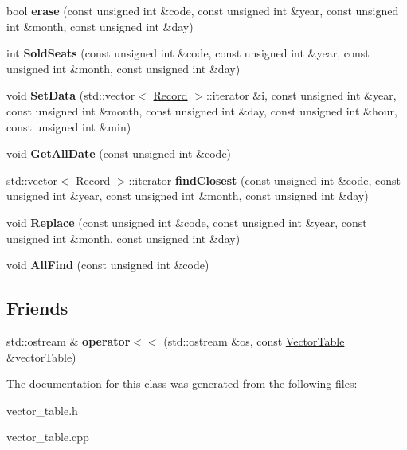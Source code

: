\begin{DoxyCompactItemize}
\item 
\hypertarget{class_vector_table_ac7d26230e13f94f50c6f064012e4fadc}{}bool {\bfseries erase} (const unsigned int \&code, const unsigned int \&year, const unsigned int \&month, const unsigned int \&day)\label{class_vector_table_ac7d26230e13f94f50c6f064012e4fadc}

\item 
\hypertarget{class_vector_table_a434d4a994da0298c0de17763b4ba31a4}{}int {\bfseries Sold\+Seats} (const unsigned int \&code, const unsigned int \&year, const unsigned int \&month, const unsigned int \&day)\label{class_vector_table_a434d4a994da0298c0de17763b4ba31a4}

\item 
\hypertarget{class_vector_table_a81b28afda7a5c323a1dbdffd17b4d866}{}void {\bfseries Set\+Data} (std\+::vector$<$ \hyperlink{struct_record}{Record} $>$\+::iterator \&i, const unsigned int \&year, const unsigned int \&month, const unsigned int \&day, const unsigned int \&hour, const unsigned int \&min)\label{class_vector_table_a81b28afda7a5c323a1dbdffd17b4d866}

\item 
\hypertarget{class_vector_table_a4c9eecaa002bc1ebe62fd61c1ef3567f}{}void {\bfseries Get\+All\+Date} (const unsigned int \&code)\label{class_vector_table_a4c9eecaa002bc1ebe62fd61c1ef3567f}

\item 
\hypertarget{class_vector_table_a12f53f971c363ddf5ca9c75c1c8ef0e1}{}std\+::vector$<$ \hyperlink{struct_record}{Record} $>$\+::iterator {\bfseries find\+Closest} (const unsigned int \&code, const unsigned int \&year, const unsigned int \&month, const unsigned int \&day)\label{class_vector_table_a12f53f971c363ddf5ca9c75c1c8ef0e1}

\item 
\hypertarget{class_vector_table_af0f4cf878c18e1d09d5154473f53b61c}{}void {\bfseries Replace} (const unsigned int \&code, const unsigned int \&year, const unsigned int \&month, const unsigned int \&day)\label{class_vector_table_af0f4cf878c18e1d09d5154473f53b61c}

\item 
\hypertarget{class_vector_table_a30c5fe29b1bd9b73d0dff4e41c54afa6}{}void {\bfseries All\+Find} (const unsigned int \&code)\label{class_vector_table_a30c5fe29b1bd9b73d0dff4e41c54afa6}

\end{DoxyCompactItemize}
\subsection*{Friends}
\begin{DoxyCompactItemize}
\item 
\hypertarget{class_vector_table_afcb2d62bcf5439f203a73d334e5492d1}{}std\+::ostream \& {\bfseries operator$<$$<$} (std\+::ostream \&os, const \hyperlink{class_vector_table}{Vector\+Table} \&vector\+Table)\label{class_vector_table_afcb2d62bcf5439f203a73d334e5492d1}

\end{DoxyCompactItemize}


The documentation for this class was generated from the following files\+:\begin{DoxyCompactItemize}
\item 
vector\+\_\+table.\+h\item 
vector\+\_\+table.\+cpp\end{DoxyCompactItemize}
